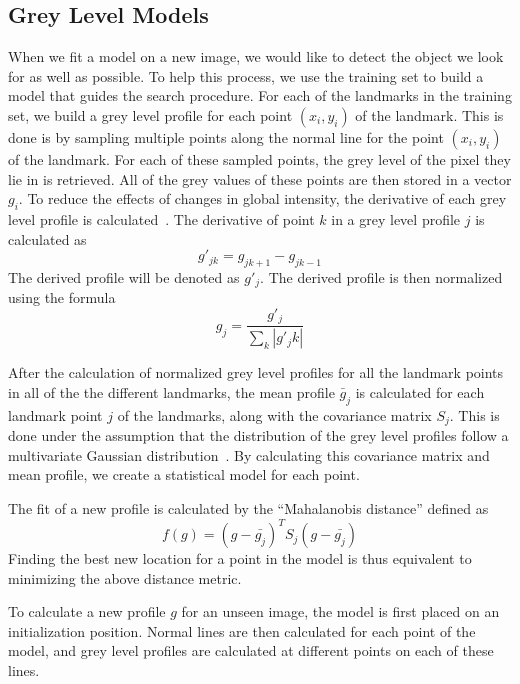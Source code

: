 \documentclass[a4paper]{article}
\begin{document}
\subsection{Grey Level Models}
\label{subsect:grey-level-models}
When we fit a model on a new image, we would like to detect the object we look for as well as possible.
To help this process, we use the training set to build a model that guides the search procedure.
For each of the landmarks in the training set, we build a grey level profile for each point $({x_i, y_i})$ of the landmark.
This is done is by sampling multiple points along the normal line for the point $({x_i, y_i})$ of the landmark.
For each of these sampled points, the grey level of the pixel they lie in is retrieved.
All of the grey values of these points are then stored in a vector \textbf{$g_i$}.
To reduce the effects of changes in global intensity, the derivative of each grey level profile is calculated~\cite{cootes1996statistical}.
The derivative of point $k$ in a grey level profile $j$ is calculated as
\begin{equation}
g'_{jk} = g_{jk+1} - g_{jk-1} 
\end{equation}
The derived profile will be denoted as $g'_j$. 
The derived profile is then normalized using the formula
\begin{equation}
g_j =\frac{g'_j}{\sum_k |g'_jk|}
\end{equation}

After the calculation of normalized grey level profiles for all the landmark points in all of the the different landmarks, the mean profile $\bar{g}_j$ is calculated for each landmark point $j$ of the landmarks, along with the covariance matrix $S_j$.
This is done under the assumption that the distribution of the grey level profiles follow a multivariate Gaussian distribution~\cite{Cootes1992AnIT}.
By calculating this covariance matrix and mean profile, we create a statistical model for each point.

The fit of a new profile is calculated by the ``Mahalanobis distance'' defined as
\begin{equation}
f(g) = (g-\bar{g_j})^TS_j(g-\bar{g_j})
\end{equation}
Finding the best new location for a point in the model is thus equivalent to minimizing the above distance metric.

To calculate a new profile $g$ for an unseen image, the model is first placed on an initialization position. Normal lines are then calculated for each point of the model, and grey level profiles are calculated at different points on each of these lines.
\end{document}
